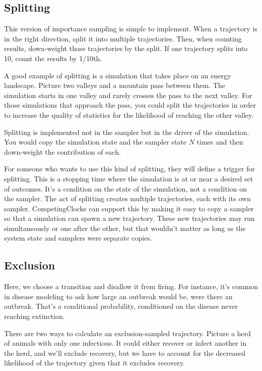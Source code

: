\documentclass{article}
\begin{document}
\subsection{Splitting}

This version of importance sampling is simple to implement. When a trajectory is in the right direction, split it into multiple trajectories. Then, when counting results, down-weight those trajectories by the split. If one trajectory splits into 10, count the results by 1/10th.

A good example of splitting is a simulation that takes place on an energy landscape. Picture two valleys and a mountain pass between them. The simulation starts in one valley and rarely crosses the pass to the next valley. For those simulations that approach the pass, you could split the trajectories in order to increase the quality of statistics for the likelihood of reaching the other valley.

Splitting is implemented not in the sampler but in the driver of the simulation. You would copy the simulation state and the sampler state $N$ times and then down-weight the contribution of each.

For someone who wants to use this kind of splitting, they will define a trigger for splitting. This is a stopping time where the simulation is at or near a desired set of outcomes. It's a condition on the state of the simulation, not a condition on the sampler. The act of splitting creates multiple trajectories, each with its own sampler. CompetingClocks can support this by making it easy to copy a sampler so that a simulation can spawn a new trajectory. These new trajectories may run simultaneously or one after the other, but that wouldn't matter as long as the system state and samplers were separate copies.


\subsection{Exclusion}

Here, we choose a transition and disallow it from firing. For instance, it's common in disease modeling to ask how large an outbreak would be, were there an outbreak. That's a conditional probability, conditioned on the disease never reaching extinction. 

There are two ways to calculate an exclusion-sampled trajectory. Picture a herd of animals with only one infectious. It could either recover or infect another in the herd, and we'll exclude recovery, but we have to account for the decreased likelihood of the trajectory given that it excludes recovery.
\end{document}
